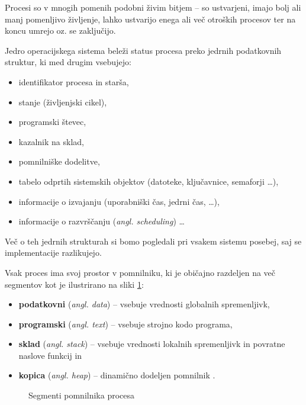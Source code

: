 \documentclass[a4paper,12pt,openright]{book}
\begin{document}
Procesi so v mnogih pomenih podobni živim bitjem -- so ustvarjeni, imajo bolj ali manj pomenljivo življenje, lahko ustvarijo enega ali več otroških procesov ter na koncu umrejo oz. se zaključijo.

Jedro operacijskega sistema beleži status procesa preko jedrnih podatkovnih struktur, ki med drugim vsebujejo:
\begin{itemize}
	\item identifikator procesa in starša,
	\item stanje (življenjski cikel),
	\item programski števec,
	\item kazalnik na sklad,
	\item pomnilniške dodelitve,
	\item tabelo odprtih sistemskih objektov (datoteke, ključavnice, semaforji \dots),
	\item informacije o izvajanju (uporabniški čas, jedrni čas, \dots),
	\item informacije o razvrščanju (\textit{angl. scheduling}) \dots
\end{itemize}
Več o teh jedrnih strukturah si bomo pogledali pri vsakem sistemu posebej, saj se implementacije razlikujejo.

Vsak proces ima svoj prostor v pomnilniku, ki je običajno razdeljen na več segmentov kot je ilustrirano na sliki \ref{fig:process_memory_segments}:
\begin{itemize}
	\item \textbf{podatkovni} (\textit{angl. data}) -- vsebuje vrednosti globalnih spremenljivk,
	\item \textbf{programski} (\textit{angl. text}) -- vsebuje strojno kodo programa,
	\item \textbf{sklad} (\textit{angl. stack}) -- vsebuje vrednosti lokalnih spremenljivk in povratne naslove funkcij in
	\item \textbf{kopica} (\textit{angl. heap}) -- dinamično dodeljen pomnilnik \cite{Silberschatz_Galvin_Gagne_2018}.
\end{itemize}

\begin{figure}[h!]
	\begin{center}
	\end{center}
	\caption{Segmenti pomnilnika procesa \cite{Silberschatz_Galvin_Gagne_2018}}
	\label{fig:process_memory_segments}
\end{figure}
\end{document}
